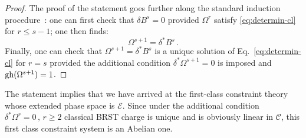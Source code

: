 \documentclass[a4paper,11pt]{amsart}
\numberwithin{thm}{section} %
\numberwithin{equation}{section} %
\numberwithin{figure}{section} %
\newcommand{\gh}[1]{{\rm gh}(#1)}
\renewcommand{\:}{{\rm\, :\,}}
\def\cc{{\mathcal C}}
\def\E{{ \mathcal E}}
\begin{document}
\begin{proof}
The proof of the statement goes further along the standard
induction procedure~\cite{[BT],[GL]}: one can first check that
$\delta B^s=0$ provided $\Omega^r$ satisfy \eqref{eq:determin-cl}
for $r\leq s-1$; one then finds:
\begin{equation}
\Omega^{s+1}=\delta^*B^s\,.
\end{equation}
Finally, one can check that $\Omega^{s+1}=\delta^*B^s$ is a unique
solution of Eq.~\eqref{eq:determin-cl} for $r=s$ provided the
additional condition $\delta^* \Omega^{s+1}=0$ is imposed
and $\gh{{\Omega^{s+1}}}=1$.
\end{proof}
The statement implies that we have arrived at the first-class
constraint theory whose extended phase space is $\E$.
Since under the additional condition
$\delta^*\Omega^r=0\,,\, r \geq 2$ classical BRST charge
is unique and is obviously linear in $\cc$, this first
class constraint system is an Abelian one.
\end{document}
